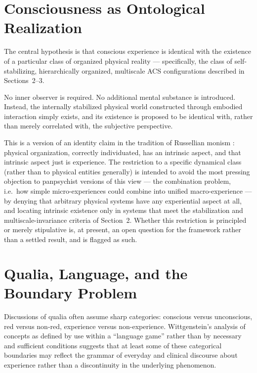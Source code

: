 \documentclass[11pt]{article}
\begin{document}
\section{Consciousness as Ontological Realization}

The central hypothesis is that conscious experience is identical with the existence of a particular class of organized physical reality --- specifically, the class of self-stabilizing, hierarchically organized, multiscale ACS configurations described in Sections~2--3.

No inner observer is required. No additional mental substance is introduced. Instead, the internally stabilized physical world constructed through embodied interaction simply exists, and its existence is proposed to be identical with, rather than merely correlated with, the subjective perspective.

This is a version of an identity claim in the tradition of Russellian monism \citep*{strawson2006}: physical organization, correctly individuated, has an intrinsic aspect, and that intrinsic aspect just is experience. The restriction to a specific dynamical class (rather than to physical entities generally) is intended to avoid the most pressing objection to panpsychist versions of this view --- the combination problem, i.e.\ how simple micro-experiences could combine into unified macro-experience \citep*{chalmers2013} --- by denying that arbitrary physical systems have any experiential aspect at all, and locating intrinsic existence only in systems that meet the stabilization and multiscale-invariance criteria of Section~2. Whether this restriction is principled or merely stipulative is, at present, an open question for the framework rather than a settled result, and is flagged as such.

\section{Qualia, Language, and the Boundary Problem}

Discussions of qualia often assume sharp categories: conscious versus unconscious, red versus non-red, experience versus non-experience. Wittgenstein's analysis of concepts as defined by use within a ``language game'' rather than by necessary and sufficient conditions \citep*{wittgenstein1953} suggests that at least some of these categorical boundaries may reflect the grammar of everyday and clinical discourse about experience rather than a discontinuity in the underlying phenomenon.
\end{document}
